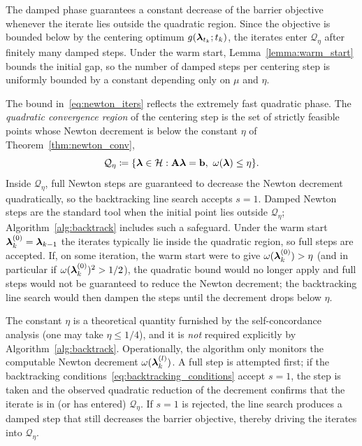 \noindent The damped phase guarantees a constant decrease of the barrier objective whenever the iterate lies outside the quadratic region. Since the objective is bounded below by the centering optimum $g(\boldsymbol{\lambda}_{t_k};t_k)$, the iterates enter $\mathcal{Q}_\eta$ after finitely many damped steps. Under the warm start, Lemma~\ref{lemma:warm_start} bounds the initial gap, so the number of damped steps per centering step is uniformly bounded by a constant depending only on $\mu$ and $\eta$.

\noindent The bound in~\eqref{eq:newton_iters} reflects the extremely fast quadratic phase. The \emph{quadratic convergence region} of the centering step is the set of strictly feasible points whose Newton decrement is below the constant $\eta$ of Theorem~\ref{thm:newton_conv},
\begin{equation}\label{eq:quad_region}
	\mathcal{Q}_\eta \coloneqq \{\lh\in\mathcal{H}:\A\lh=\b,\ \omega(\lh)\le\eta\}.
\end{equation}
Inside $\mathcal{Q}_\eta$, full Newton steps are guaranteed to decrease the Newton decrement quadratically, so the backtracking line search accepts $s=1$. Damped Newton steps are the standard tool when the initial point lies outside $\mathcal{Q}_\eta$; Algorithm~\ref{alg:backtrack} includes such a safeguard. Under the warm start $\boldsymbol{\lambda}_k^{(0)}=\boldsymbol{\lambda}_{k-1}$ the iterates typically lie inside the quadratic region, so full steps are accepted. If, on some iteration, the warm start were to give $\omega(\boldsymbol{\lambda}_k^{(0)})>\eta$ (and in particular if $\omega(\boldsymbol{\lambda}_k^{(0)})^2>1/2$), the quadratic bound would no longer apply and full steps would not be guaranteed to reduce the Newton decrement; the backtracking line search would then dampen the steps until the decrement drops below $\eta$.

The constant $\eta$ is a theoretical quantity furnished by the self-concordance analysis (one may take $\eta\le 1/4$), and it is \emph{not} required explicitly by Algorithm~\ref{alg:backtrack}. Operationally, the algorithm only monitors the computable Newton decrement $\omega(\boldsymbol{\lambda}_k^{(l)})$. A full step is attempted first; if the backtracking conditions~\eqref{eq:backtracking_conditions} accept $s=1$, the step is taken and the observed quadratic reduction of the decrement confirms that the iterate is in (or has entered) $\mathcal{Q}_\eta$. If $s=1$ is rejected, the line search produces a damped step that still decreases the barrier objective, thereby driving the iterates into $\mathcal{Q}_\eta$.

